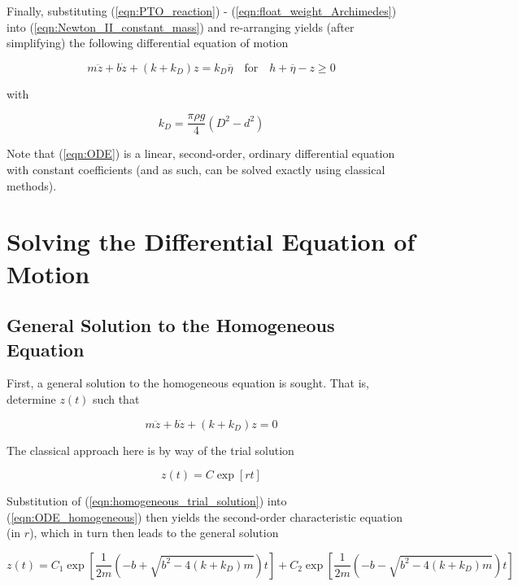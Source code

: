 Finally, substituting (\ref{eqn:PTO_reaction}) - (\ref{eqn:float_weight_Archimedes}) into (\ref{eqn:Newton_II_constant_mass}) and re-arranging yields (after simplifying) the following differential equation of motion 

\begin{equation}
	m\ddot{z} + b\dot{z} + \left(k + k_D\right)z = k_D\overline{\eta}\quad\textrm{for}\quad h + \overline{\eta} - z \geq 0
	\label{eqn:ODE}
\end{equation}

\noindent with

\begin{equation}
	k_D = \frac{\pi\rho g}{4}(D^2 - d^2)
	\label{eqn:k_D}
\end{equation}

\noindent Note that (\ref{eqn:ODE}) is a linear, second-order, ordinary differential equation with constant coefficients (and as such, can be solved exactly using classical methods).

\section{Solving the Differential Equation of Motion}

\subsection{General Solution to the Homogeneous Equation}

First, a general solution to the homogeneous equation is sought. That is, determine $z(t)$ such that

\begin{equation}
	m\ddot{z} + b\dot{z} + \left(k + k_D\right)z = 0
	\label{eqn:ODE_homogeneous}
\end{equation}

\noindent The classical approach here is by way of the trial solution

\begin{equation}
	z(t) = C\exp[rt]
	\label{eqn:homogeneous_trial_solution}
\end{equation}

\noindent Substitution of (\ref{eqn:homogeneous_trial_solution}) into (\ref{eqn:ODE_homogeneous}) then yields the second-order characteristic equation (in $r$), which in turn then leads to the general solution

\begin{equation}
	z(t) = C_1\exp\left[\frac{1}{2m}\left(-b+\sqrt{b^2 - 4(k + k_D)m}\right)t\right] + C_2\exp\left[\frac{1}{2m}\left(-b-\sqrt{b^2 - 4(k + k_D)m}\right)t\right]
	\label{eqn:ODE_general_solution}
\end{equation}

